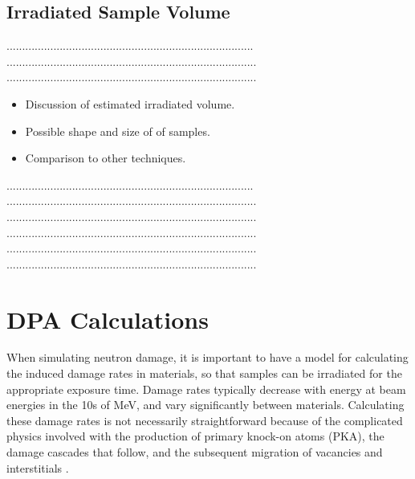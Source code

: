 \documentclass[final,3p,times,twocolumn]{elsarticle} %
\begin{document}
\subsection{Irradiated Sample Volume}
...............................................................................\\
................................................................................\\
................................................................................\\
\begin{itemize}
\item Discussion of estimated irradiated volume.
\item Possible shape and size of of samples.
\item Comparison to other techniques.
\end{itemize}
...............................................................................\\
................................................................................\\
................................................................................\\
................................................................................\\
................................................................................\\
................................................................................\\


\section{DPA Calculations} 

When simulating neutron damage, it is important to have a model for calculating the induced damage rates in materials, so that samples can be irradiated for the appropriate exposure time.  Damage rates typically decrease with energy at beam energies in the 10s of MeV, and vary significantly between materials.  Calculating these damage rates is not necessarily straightforward because of the complicated physics involved  with the production of primary knock-on  atoms (PKA), the damage cascades that follow, and the subsequent migration of vacancies and interstitials \cite{Was}. 

\end{document}
